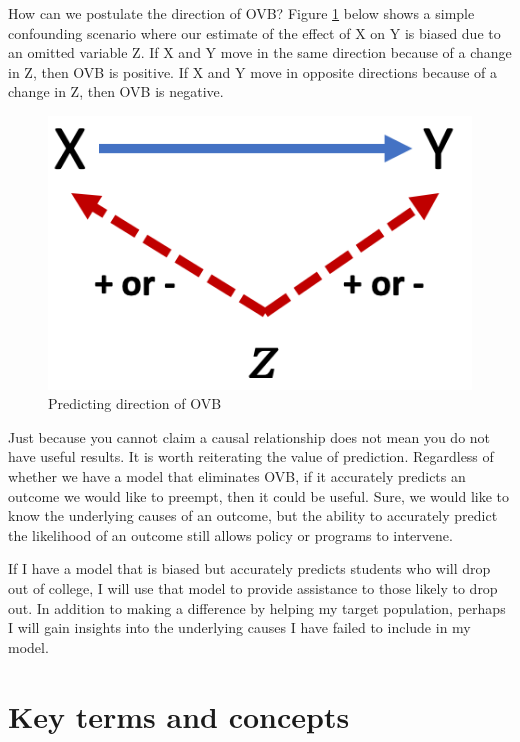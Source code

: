 \documentclass[
]{book}
\begin{document}
How can we postulate the direction of OVB? Figure \ref{fig:dagovbdirect} below shows a simple confounding scenario where our estimate of the effect of X on Y is biased due to an omitted variable Z. If X and Y move in the same direction because of a change in Z, then OVB is positive. If X and Y move in opposite directions because of a change in Z, then OVB is negative.

\begin{figure}

{\centering \includegraphics[width=\textwidth]{images/dag_ovbdirect} 

}

\caption{Predicting direction of OVB}\label{fig:dagovbdirect}
\end{figure}

Just because you cannot claim a causal relationship does not mean you do not have useful results. It is worth reiterating the value of prediction. Regardless of whether we have a model that eliminates OVB, if it accurately predicts an outcome we would like to preempt, then it could be useful. Sure, we would like to know the underlying causes of an outcome, but the ability to accurately predict the likelihood of an outcome still allows policy or programs to intervene.

If I have a model that is biased but accurately predicts students who will drop out of college, I will use that model to provide assistance to those likely to drop out. In addition to making a difference by helping my target population, perhaps I will gain insights into the underlying causes I have failed to include in my model.

\hypertarget{kt9}{%
\section{Key terms and concepts}\label{kt9}}
\end{document}
